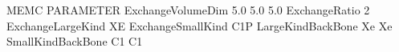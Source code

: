 \documentclass[letterpaper,10pt,english]{sphinxmanual}
\begin{document}
\begin{sphinxVerbatim}[commandchars=\\\{\}]
\PYGZsh{}\PYGZsh{}\PYGZsh{}\PYGZsh{}\PYGZsh{}\PYGZsh{}\PYGZsh{}\PYGZsh{}\PYGZsh{}\PYGZsh{}\PYGZsh{}\PYGZsh{}\PYGZsh{}\PYGZsh{}\PYGZsh{}\PYGZsh{}\PYGZsh{}\PYGZsh{}\PYGZsh{}\PYGZsh{}\PYGZsh{}\PYGZsh{}\PYGZsh{}\PYGZsh{}\PYGZsh{}\PYGZsh{}\PYGZsh{}\PYGZsh{}\PYGZsh{}\PYGZsh{}\PYGZsh{}\PYGZsh{}\PYGZsh{}\PYGZsh{}\PYGZsh{}\PYGZsh{}\PYGZsh{}\PYGZsh{}\PYGZsh{}\PYGZsh{}\PYGZsh{}\PYGZsh{}\PYGZsh{}\PYGZsh{}\PYGZsh{}\PYGZsh{}\PYGZsh{}\PYGZsh{}\PYGZsh{}\PYGZsh{}\PYGZsh{}\PYGZsh{}\PYGZsh{}\PYGZsh{}\PYGZsh{}\PYGZsh{}\PYGZsh{}\PYGZsh{}\PYGZsh{}\PYGZsh{}\PYGZsh{}\PYGZsh{}\PYGZsh{}\PYGZsh{}\PYGZsh{}\PYGZsh{}\PYGZsh{}\PYGZsh{}\PYGZsh{}\PYGZsh{}
\PYGZsh{} MEMC PARAMETER
\PYGZsh{}\PYGZsh{}\PYGZsh{}\PYGZsh{}\PYGZsh{}\PYGZsh{}\PYGZsh{}\PYGZsh{}\PYGZsh{}\PYGZsh{}\PYGZsh{}\PYGZsh{}\PYGZsh{}\PYGZsh{}\PYGZsh{}\PYGZsh{}\PYGZsh{}\PYGZsh{}\PYGZsh{}\PYGZsh{}\PYGZsh{}\PYGZsh{}\PYGZsh{}\PYGZsh{}\PYGZsh{}\PYGZsh{}\PYGZsh{}\PYGZsh{}\PYGZsh{}\PYGZsh{}\PYGZsh{}\PYGZsh{}\PYGZsh{}\PYGZsh{}\PYGZsh{}\PYGZsh{}\PYGZsh{}\PYGZsh{}\PYGZsh{}\PYGZsh{}\PYGZsh{}\PYGZsh{}\PYGZsh{}\PYGZsh{}\PYGZsh{}\PYGZsh{}\PYGZsh{}\PYGZsh{}\PYGZsh{}\PYGZsh{}\PYGZsh{}\PYGZsh{}\PYGZsh{}\PYGZsh{}\PYGZsh{}\PYGZsh{}\PYGZsh{}\PYGZsh{}\PYGZsh{}\PYGZsh{}\PYGZsh{}\PYGZsh{}\PYGZsh{}\PYGZsh{}\PYGZsh{}\PYGZsh{}\PYGZsh{}\PYGZsh{}\PYGZsh{}\PYGZsh{}
ExchangeVolumeDim   5.0   5.0   5.0
ExchangeRatio       2
ExchangeLargeKind   XE
ExchangeSmallKind   C1P
LargeKindBackBone   Xe Xe
SmallKindBackBone   C1 C1
\end{sphinxVerbatim}
\end{document}
